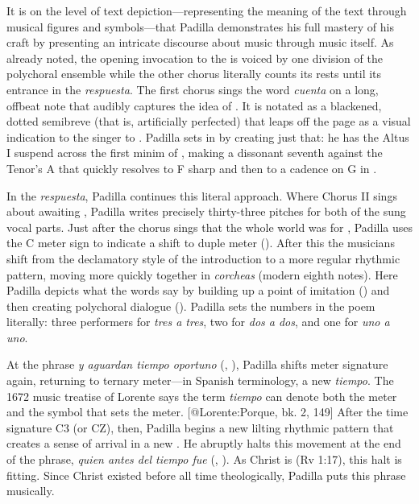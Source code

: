 It is on the level of text depiction---representing the meaning of the text
through musical figures and symbols---that Padilla demonstrates his full mastery
of his craft by presenting an intricate discourse about music through music
itself.
As already noted, the opening invocation to the  is voiced by one division of the polychoral
ensemble while the other chorus literally counts its rests until its entrance in
the \emph{respuesta}.
The first chorus sings the word \emph{cuenta} on a long, offbeat note that audibly
captures the idea of .
It is notated as a blackened, dotted semibreve (that is, artificially perfected)
that leaps off the page as a visual indication to the singer to .
Padilla sets  in  by creating just that: he
has the Altus I suspend across the first minim of , making a dissonant
seventh against the Tenor's A that quickly resolves to F sharp and then to a
cadence on G in .

In the \emph{respuesta}, Padilla continues this literal approach.
Where Chorus II sings about awaiting , Padilla writes
precisely thirty-three pitches for both of the sung vocal parts.
Just after the chorus sings that the whole world was  for , Padilla uses the C meter sign to indicate a shift to duple meter ().
After this the musicians shift from the declamatory style of the introduction to
a more regular rhythmic pattern, moving more quickly together in \emph{corcheas}
(modern eighth notes).
Here Padilla depicts what the words say by building up a point of imitation
 () and then creating polychoral dialogue
().
Padilla sets the numbers in the poem literally: three performers for
\emph{tres a tres}, two for \emph{dos a dos}, and one for \emph{uno a uno}.

At the phrase \emph{y aguardan tiempo oportuno} (,
), Padilla shifts meter signature again, returning to ternary meter---in
Spanish terminology, a new \emph{tiempo}.
The 1672 music treatise of Lorente says the term \emph{tiempo} can denote both the
meter and the symbol that sets the meter.
[@Lorente:Porque, bk. 2, 149]
After the time signature C3 (or CZ), then, Padilla begins a new lilting rhythmic
pattern that creates a sense of arrival in a new .
He abruptly halts this movement at the end of the phrase, \emph{quien antes del
tiempo fue} (, ).
As Christ is  (Rv 1:17), this halt is fitting.
Since Christ existed before all time theologically, Padilla puts this phrase
 musically.

